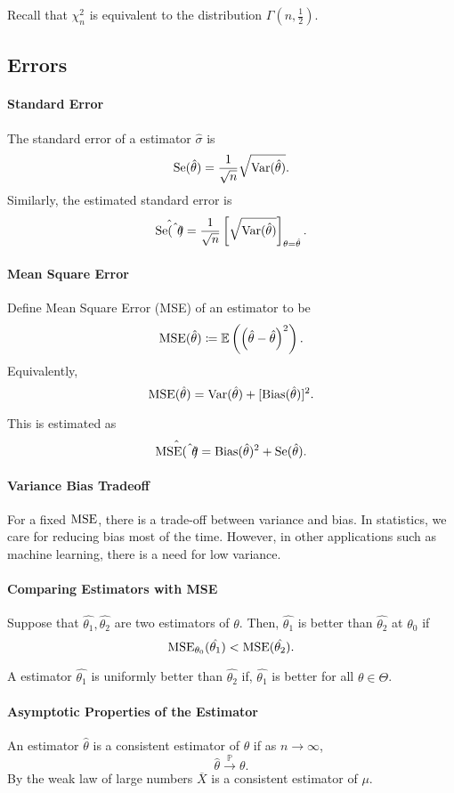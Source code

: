 Recall that \(\chi^2_n\) is equivalent to the distribution \(\Gamma(n, \frac{1}{2})\).

\subsection{Errors}

\paragraph{Standard Error}
The standard error of a estimator \(\hat{\sigma}\) is \[
  \mathrm{Se}(\hat{\theta}) = \frac{1}{\sqrt{n} } \sqrt{\mathrm{Var}(\hat{\theta})}
.\] 
Similarly, the estimated standard error is \[
  \hat{\mathrm{Se}(\hat{\theta})} = \frac{1}{\sqrt{n} }
  \left[ \sqrt{\mathrm{Var}(\hat{\theta})} \right]_{\theta = \hat{\theta}}
.\] 

\paragraph{Mean Square Error}
Define Mean Square Error (MSE) of an estimator to be \[
  \mathrm{MSE}(\hat{\theta}) \coloneqq \mathbb{E}\left( \left( \hat{\theta}  - \hat{\theta}\right)^2 \right) 
.\] 
Equivalently, \[
  \mathrm{MSE}(\hat{\theta}) = \mathrm{Var}(\hat{\theta}) + [\mathrm{Bias}(\hat{\theta})]^2
.\] 

This is estimated as \[
  \hat{\mathrm{MSE}(\hat{\theta})} = \mathrm{Bias}(\hat{\theta})^2 + \mathrm{Se}(\hat{\theta})
.\] 

\paragraph{Variance Bias Tradeoff}
For a fixed \(\mathrm{MSE}\), there is a trade-off between variance and bias.
In statistics, we care for reducing bias most of the time.
However, in other applications such as machine learning, there is a
need for low variance.

\paragraph{Comparing Estimators with MSE}
Suppose that \(\hat{\theta_1}, \hat{\theta_2}\) are two estimators of \(\theta\).
Then, \(\hat{\theta_1}\) is better than \(\hat{\theta_2}\) at \(\theta_0\)
if \[
  \mathrm{MSE}_{\theta_0}(\hat{\theta_1}) < \mathrm{MSE}(\hat{\theta_2})
.\]

A estimator \(\hat{\theta_1}\) is uniformly better than \(\hat{\theta_2}\) if,
\(\hat{\theta_1}\) is better for all  \(\theta \in  \Theta\).

\paragraph{Asymptotic Properties of the Estimator}
An estimator \(\hat{\theta}\) is a consistent estimator of \(\theta\) if as
\(n \to  \infty\), \[
  \hat{\theta} \xrightarrow{\mathbb{P}} \theta
.\] 
By the weak law of large numbers \(\overline{X}\) is a consistent estimator of \(\mu\).

